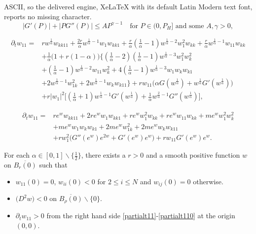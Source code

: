 \documentclass[10pt,a4paper]{amsart}
\begin{document}
ASCII, so the delivered engine, XeLaTeX with its default Latin Modern text font, reports no missing character.
\begin{equation}\label{g0b}
|G'(P)|+|PG''(P)|\leq AP^{\gamma-1}\quad \text{for }P\in(0,P_H] \text{ and some }A, \gamma>0,
\end{equation}

\begin{equation}\label{partialt11}
\begin{aligned}
    \partial_t w_{11}=&rw^{\frac{1}{\alpha}}w_{kk11}+\frac{2r}{\alpha}w^{\frac{1}{\alpha}-1}w_1w_{kk1}+\frac{r}{\alpha}(\frac{1}{\alpha}-1)w^{\frac{1}{\alpha}-2}w_1^2w_{kk}+\frac{r}{\alpha}w^{\frac{1}{\alpha}-1}w_{11}w_{kk}\\
    &+\frac{1}{\alpha}\big(1+r(1-\alpha)\big)\{(\frac{1}{\alpha}-2)(\frac{1}{\alpha}-1)w^{\frac{1}{\alpha}-3}w_1^2w_k^2\\
    &+(\frac{1}{\alpha}-1)w^{\frac{1}{\alpha}-2}w_{11}w_k^2+4(\frac{1}{\alpha}-1)w^{\frac{1}{\alpha}-3}w_1w_kw_{k1}\\
    &+2w^{\frac{1}{\alpha}-1}w_{1k}^2+2w^{\frac{1}{\alpha}-1}w_kw_{k11}\}+rw_{11}\big(\alpha G(w^{\frac{1}{\alpha}})+w^{\frac{1}{\alpha}}G'(w^{\frac{1}{\alpha}})\big)\\
    &+r|w_1|^2\big[(\frac{1}{\alpha}+1)w^{\frac{1}{\alpha}-1}G'(w^{\frac{1}{\alpha}})+\frac{1}{\alpha}w^{\frac{2}{\alpha}-1}G''(w^{\frac{1}{\alpha}})\big],
\end{aligned}
\end{equation}

\begin{equation}\label{partialt110}
\begin{aligned}
\partial_t w_{11}=&re^ww_{kk11}+2re^{w}w_1w_{kk1}+re^ww_1^2w_{kk}+re^ww_{11}w_{kk}+me^ww_1^2w_k^2\\
&+me^ww_1w_kw_{k1}+2me^ww_{1k}^2+2me^ww_kw_{k11}\\
&+rw_{1}^2\big(G''(e^w)e^{2w}+G'(e^w)e^w\big)+rw_{11} G'(e^w)e^w.
\end{aligned}    
\end{equation}

\begin{lemma}\label{npcl}
 For each $\alpha\in[0,1]\backslash\{\frac{1}{2}\}$, there exists a $r>0$  and a smooth  positive function $w$ on $\overline{B_r(0)}$ such that 
 \begin{itemize}
    \item[(\expandafter{\romannumeral1})] $w_{11}(0)=0$, $w_{ii}(0)<0$ for $2\leq i\leq N$ and $w_{ij}(0)=0$ otherwise.
    \item[(\expandafter{\romannumeral2})] $\big(D^{2}w\big)<0$ on $\overline{B_{\rho}(0)}\backslash \{0\}$.
    \item[(\expandafter{\romannumeral3})] $\partial_t w_{11}>0$ from the right hand side \eqref{partialt11}-\eqref{partialt110} at the origin $(0,0)$.
\end{itemize}
\end{lemma}
\end{document}
